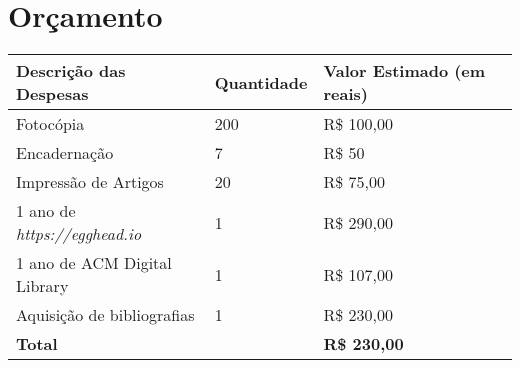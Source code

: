 \section{Orçamento}\label{lorcamento}

\begin{center}
  \tiny
  \begin{tabular}{| l | l | l | l |}
  \hline
  \textbf{Descrição das Despesas} & \textbf{Quantidade} & \textbf{Valor Estimado (em reais)} \\ \hline
  Fotocópia & 200 & R\$ 100,00 \\ \hline
  Encadernação & 7 & R\$ 50 \\ \hline
  Impressão de Artigos & 20 & R\$ 75,00 \\ \hline
  1 ano de \textit{https://egghead.io} & 1 & R\$ 290,00 \\ \hline
  1 ano de ACM Digital Library & 1 & R\$ 107,00 \\ \hline
  Aquisição de bibliografias & 1 & R\$ 230,00 \\
  \hline \hline
  \textbf{Total} & & \textbf{R\$ 230,00} \\
  \hline
  \end{tabular}
\end{center}
